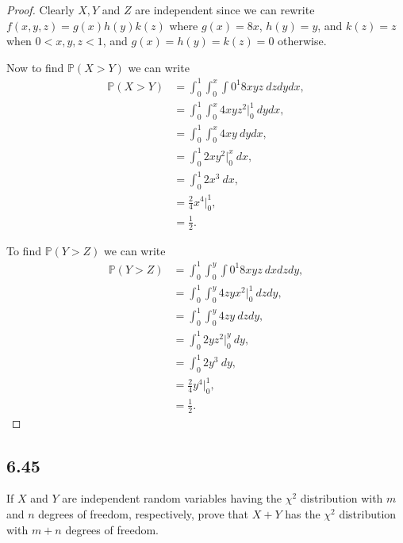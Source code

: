 \documentclass{article}
\renewcommand{\P}[1]{\mathbb{P}(#1)}
\begin{document}
\begin{proof}
    Clearly $X, Y$ and $Z$ are independent since we can rewrite
    $f(x,y,z) = g(x)h(y)k(z)$ where $g(x) = 8x$, $h(y) = y$, and
    $k(z) = z$ when $0 < x,y,z < 1$, and $g(x)=h(y)=k(z) = 0$
    otherwise.

    Now to find $\P{X > Y}$ we can write
    \begin{align*}
        \P{X > Y} & = \int_0^1 \int_0^x \int 0^1 8xyz \ dzdydx,   \\
                  & = \int_0^1 \int_0^x 4xyz^2 \big |_0^1 \ dydx, \\
                  & = \int_0^1 \int_0^x 4xy \ dydx,               \\
                  & = \int_0^1 2xy^2 \big |_0^x \ dx,             \\
                  & = \int_0^1 2x^3 \ dx,                         \\
                  & = \frac{2}{4}x^4 \big |_0^1,                  \\
                  & = \frac{1}{2}.
    \end{align*}

    To find $\P{Y > Z}$ we can write
    \begin{align*}
        \P{Y > Z} & = \int_0^1 \int_0^y \int 0^1 8xyz \ dxdzdy,   \\
                  & = \int_0^1 \int_0^y 4zyx^2 \big |_0^1 \ dzdy, \\
                  & = \int_0^1 \int_0^y 4zy \ dzdy,               \\
                  & = \int_0^1 2yz^2 \big |_0^y \ dy,             \\
                  & = \int_0^1 2y^3 \ dy,                         \\
                  & = \frac{2}{4}y^4 \big |_0^1,                  \\
                  & = \frac{1}{2}.
    \end{align*}
\end{proof}

\subsection*{6.45}
If $X$ and $Y$ are independent random variables having the $\chi^2$ distribution
with $m$ and $n$ degrees of freedom, respectively, prove that $X+Y$ has the
$\chi^2$ distribution with $m+n$ degrees of freedom.
\end{document}
